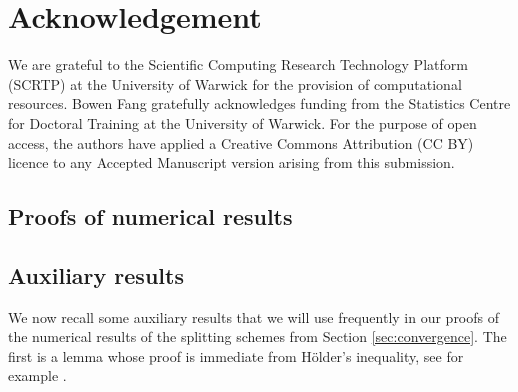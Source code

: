 \documentclass[a4paper,12pt]{article}
\numberwithin{equation}{section}
\theoremstyle{plain}
\theoremstyle{definition}
\begin{document}
\section*{Acknowledgement}
We are grateful to the Scientific Computing Research Technology Platform (SCRTP) at the University of Warwick for the provision of computational resources. Bowen Fang gratefully acknowledges funding from the Statistics Centre for Doctoral Training at the University of Warwick. For the purpose of open access, the authors have applied a Creative Commons Attribution (CC BY) licence to any Accepted
Manuscript version arising from this submission.
  
     
\begin{appendix}
\section{Proofs of numerical results} 
\label{sec:appendix A}
\subsection{Auxiliary results}
 We now recall some auxiliary results that we will use frequently in our proofs of the numerical results of the splitting schemes from Section \ref{sec:convergence}. The first is a lemma whose proof is immediate from H\"older's inequality, see for example \cite{schurz_axiomatic_2006}.


\end{appendix}
\end{document}
